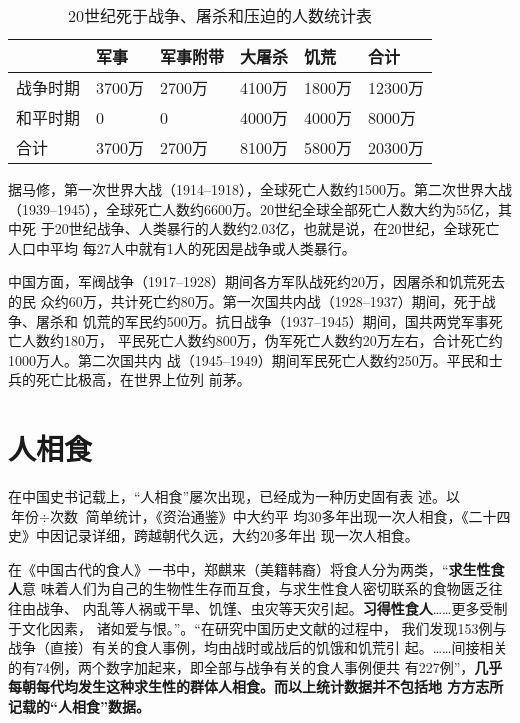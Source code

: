 \begin{table}[h]
  \centering
  \begin{tabular}{@{}llllll@{}}
    \toprule & 军事 & 军事附带 & 大屠杀 & 饥荒 & 合计 \\ \midrule
    战争时期 & 3700万 & 2700万 & 4100万 & 1800万 & 12300万 \\
    和平时期 & 0 & 0 & 4000万 & 4000万 & 8000万 \\
    合计 & 3700万 & 2700万 & 8100万 & 5800万 & 20300万 \\ \bottomrule
  \end{tabular}
  \caption{20世纪死于战争、屠杀和压迫的人数统计表}
  \label{tab:20stdied}
\end{table}

据马修，第一次世界大战（1914--1918），全球死亡人数约1500万。第二次世界大战
（1939--1945），全球死亡人数约6600万。20世纪全球全部死亡人数大约为55亿，其中死
于20世纪战争、人类暴行的人数约2.03亿，也就是说，在20世纪，全球死亡人口中平均
每27人中就有1人的死因是战争或人类暴行。

中国方面，军阀战争（1917--1928）期间各方军队战死约20万，因屠杀和饥荒死去的民
众约60万，共计死亡约80万。第一次国共内战（1928--1937）期间，死于战争、屠杀和
饥荒的军民约500万。抗日战争（1937--1945）期间，国共两党军事死亡人数约180万，
平民死亡人数约800万，伪军死亡人数约20万左右，合计死亡约1000万人。第二次国共内
战（1945--1949）期间军民死亡人数约250万。平民和士兵的死亡比极高，在世界上位列
前茅。

\section{人相食}

在中国史书记载上，“人相食”屡次出现，已经成为一种历史固有表
述\cite{renxiangshi}。以 $ \mbox{年份} \div \mbox{次数} $ 简单统计，《资治通鉴》中大约平
均30多年出现一次人相食，《二十四史》中因记录详细，跨越朝代久远，大约20多年出
现一次人相食。

在《中国古代的食人》一书中，郑麒来（美籍韩裔）将食人分为两类，“\textbf{求生性食人}意
味着人们为自己的生物性生存而互食，与求生性食人密切联系的食物匮乏往往由战争、
内乱等人祸或干旱、饥馑、虫灾等天灾引起。\textbf{习得性食人}……更多受制于文化因素，
诸如爱与恨。”\cite[152]{9787500415480}。“在研究中国历史文献的过程中，
我们发现153例与战争（直接）有关的食人事例，均由战时或战后的饥饿和饥荒引
起。……间接相关的有74例，两个数字加起来，即全部与战争有关的食人事例便共
有227例”，\textbf{几乎每朝每代均发生这种求生性的群体人相食。而以上统计数据并不包括地
方方志所记载的“人相食”数据。}

